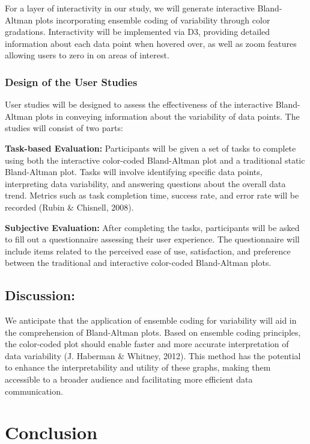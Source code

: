 \documentclass[print]{nuthesis}
\begin{document}
For a layer of interactivity in our study, we will generate interactive Bland-Altman plots incorporating ensemble coding of variability through color gradations.
Interactivity will be implemented via D3, providing detailed information about each data point when hovered over, as well as zoom features allowing users to zero in on areas of interest.

\hypertarget{design-of-the-user-studies}{%
\subsection{Design of the User Studies}\label{design-of-the-user-studies}}

User studies will be designed to assess the effectiveness of the interactive Bland-Altman plots in conveying information about the variability of data points.
The studies will consist of two parts:

\textbf{Task-based Evaluation:} Participants will be given a set of tasks to complete using both the interactive color-coded Bland-Altman plot and a traditional static Bland-Altman plot.
Tasks will involve identifying specific data points, interpreting data variability, and answering questions about the overall data trend.
Metrics such as task completion time, success rate, and error rate will be recorded (Rubin \& Chisnell, 2008).

\textbf{Subjective Evaluation:} After completing the tasks, participants will be asked to fill out a questionnaire assessing their user experience.
The questionnaire will include items related to the perceived ease of use, satisfaction, and preference between the traditional and interactive color-coded Bland-Altman plots.

\hypertarget{discussion-1}{%
\section{Discussion:}\label{discussion-1}}

We anticipate that the application of ensemble coding for variability will aid in the comprehension of Bland-Altman plots.
Based on ensemble coding principles, the color-coded plot should enable faster and more accurate interpretation of data variability (J. Haberman \& Whitney, 2012).
This method has the potential to enhance the interpretability and utility of these graphs, making them accessible to a broader audience and facilitating more efficient data communication.

\hypertarget{conclusion-1}{%
\chapter*{Conclusion}\label{conclusion-1}}
\end{document}
